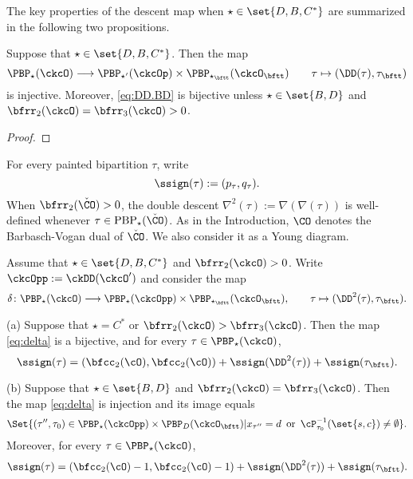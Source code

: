 \documentclass[ssunip]{subfiles}
\begin{document}
\medskip

The key properties of the descent map when $\star\in \set{D,B,C^*}$ are summarized in the following two propositions.   

\begin{prop}\label{prop:DD.BD}
Suppose that $\star \in \set{D,B,C^*}$.
Then the map 
\begin{equation}\label{eq:DD.BD}
   \PBP_\star(\ckcO)\longrightarrow
   \PBP_{\star'}(\ckcOp)\times \PBP_{\star_\bftt}(\ckcO_\bftt)
   \qquad \tau \mapsto (\DD(\tau), \tau_\bftt)
\end{equation}
is injective. Moreover, \eqref{eq:DD.BD} is bijective 
unless $\star\in \set{B,D}$ and $\bfrr_2(\ckcO)=\bfrr_3(\ckcO)>0$. 
\end{prop}
\begin{proof}
  
\end{proof}



For every painted bipartition $\tau$, write
\[
  \ssign(\tau):=(p_\tau, q_\tau).
\]
When $\bfrr_2(\check \CO)>0$, the double descent $\nabla^2(\tau):=\nabla(\nabla(\tau))$ is well-defined whenever $\tau\in \mathrm{PBP}_\star(\check \CO)$. 
As in the Introduction, $\CO$ denotes the Barbasch-Vogan dual of $\check \CO$. We also consider it as a Young diagram. 

\begin{prop}\label{prop:delta}
Assume that $\star \in \set{D,B,C^*}$ and $\bfrr_2(\ckcO)>0$. Write $\ckcOpp := \ckDD(\ckcO')$ and consider the map 
\begin{equation}\label{eq:delta}
  \delta  \colon \PBP_\star(\ckcO)\longrightarrow 
    \PBP_\star(\ckcOpp)\times \PBP_{\star_\bftt}(\ckcO_\bftt),
    \qquad \tau \mapsto (\DD^2(\tau),\tau_\bftt).
\end{equation}

\noindent (a) Suppose that 
$\star = C^*$ or $\bfrr_2(\ckcO)>\bfrr_3(\ckcO)$. Then the map \eqref{eq:delta} is a bijective, and for every $\tau\in  \PBP_\star(\ckcO) $, 
\[
\ssign(\tau)
=(\bfcc_2(\cO),\bfcc_2(\cO))+\ssign(\DD^2(\tau))+\ssign(\tau_\bftt).
\]

\noindent (b) Suppose that  $\star \in \set{B,D}$ and $\bfrr_2(\ckcO)=\bfrr_3(\ckcO)$. Then the map \eqref{eq:delta} is  injection and its  image equals 
    \[
    \Set{ (\tau'',\tau_0)  \in \PBP_\star(\ckcOpp)\times \PBP_D(\ckcO_\bftt)  | 
    x_{\tau''} = d\, \text{ or } \,
    \cP_{\tau_0}^{-1}(\set{s,c})\neq \emptyset }.
    \]
    Moreover,  for every $\tau\in  \PBP_\star(\ckcO) $, 
\[
\ssign(\tau)
=(\bfcc_2(\cO)-1,\bfcc_2(\cO)-1)+\ssign(\DD^2(\tau))+\ssign(\tau_\bftt).
\]
\end{prop}
\end{document}
